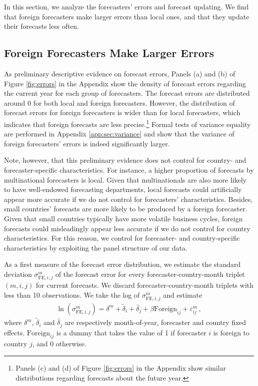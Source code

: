 
In this section, we analyze the forecasters' errors and forecast updating. We find that foreign forecasters make larger errors than local ones, and that they update their forecasts less often.

\subsection{Foreign Forecasters Make Larger Errors}

As preliminary descriptive evidence on forecast errors, Panels (a) and (b) of Figure \ref{fig:errors} in the Appendix show the density of forecast errors regarding the current year for each group of forecasters. The forecast errors are distributed around 0 for both local and foreign forecasters. However, the distribution of forecast errors for foreign forecasters is wider than for local forecasters, which indicates that foreign forecasts are less precise.\footnote{Panels (c) and (d) of Figure \ref{fig:errors} in the Appendix show similar distributions regarding forecasts about the future year.} Formal tests of variance equality are performed in Appendix \ref{app:sec:variance} and show that the variance of foreign forecasters' errors is indeed significantly larger.

Note, however, that this preliminary evidence does not control for country- and forecaster-specific characteristics. For instance, a higher proportion of forecasts by multinational forecasters is local. Given that multinationals are also more likely to have well-endowed forecasting departments, local forecasts could artificially appear more accurate if we do not control for forecasters' characteristics. Besides, small countries' forecasts are more likely to be produced by a foreign forecaster. Given that small countries typically have more volatile business cycles, foreign forecasts could misleadingly appear less accurate if we do not control for country characteristics. For this reason, we control for forecaster- and country-specific characteristics by exploiting the panel structure of our data.

As a first measure of the forecast error distribution, we estimate the standard deviation $\sigma^m_{\text{FE},i,j}$ of the forecast error for every forecaster-country-month triplet $(m,i,j)$ for current forecasts. We discard forecaster-country-month triplets with less than 10 observations. We take the log of $\sigma^m_{\text{FE},i,j}$ and estimate
\begin{align}
	\ln(\sigma^m_{\text{FE},i,j}) =  \delta^m +\tilde\delta_{i} + \bar{\delta}_{j} +
\beta \text{Foreign}_{ij} + \varepsilon_{ij}^m  \,, \label{eq:regModelSE_FE}
\end{align}
where  $ \delta^m $, $\tilde\delta_{i} $ and $\bar{\delta}_{j} $ are respectively month-of-year, forecaster and country fixed effects. $\text{Foreign}_{ij} $ is a dummy that takes the value of 1 if forecaster $i$ is foreign to country $j$, and 0 otherwise.

